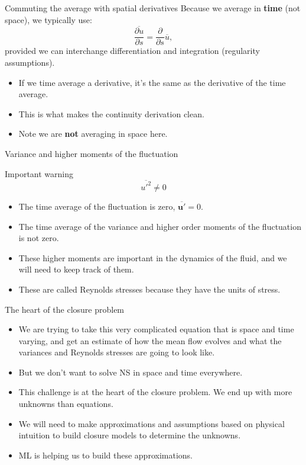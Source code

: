 \documentclass[aspectratio=169]{beamer}
\newcommand{\uu}{\bm{u}}
\newcommand{\avg}[1]{\overline{#1}}
\newcommand{\up}{\uu'}
\begin{document}
\begin{frame}{Commuting the average with spatial derivatives}
Because we average in \textbf{time} (not space), we typically use:
\[
\avg{\frac{\partial u}{\partial s}}
=
\frac{\partial}{\partial s}\avg{u},
\]
provided we can interchange differentiation and integration (regularity assumptions).

\begin{itemize}
  \item If we time average a derivative, it's the same as the derivative of the time average.
  \item This is what makes the continuity derivation clean.
  \item Note we are \textbf{not} averaging in space here.
\end{itemize}

\end{frame}

\begin{frame}{Variance and higher moments of the fluctuation}
\begin{block}{Important warning}
\[
\avg{u'^2}\neq 0
\]
\end{block}
\vfill
\begin{itemize}
  \item The time average of the fluctuation is zero, $\avg{\up}=0$.
  \item The time average of the variance and higher order moments of the fluctuation is not zero.
  \item These higher moments are important in the dynamics of the fluid, and we will need to keep track of them.
  \item These are called Reynolds stresses because they have the units of stress.
\end{itemize}
    
\end{frame}

\begin{frame}{The heart of the closure problem}
    \begin{itemize}
        \item We are trying to take this very complicated equation that is space and time varying, and get an estimate of how the mean flow evolves and what the variances and Reynolds stresses are going to look like.
        \item But we don't want to solve NS in space and time everywhere.
        \item This challenge is at the heart of the closure problem. We end up with more unknowns than equations.
        \item We will need to make approximations and assumptions based on physical intuition to build closure models to determine the unknowns.
        \item ML is helping us to build these approximations.
    \end{itemize}
\end{frame}
\end{document}
